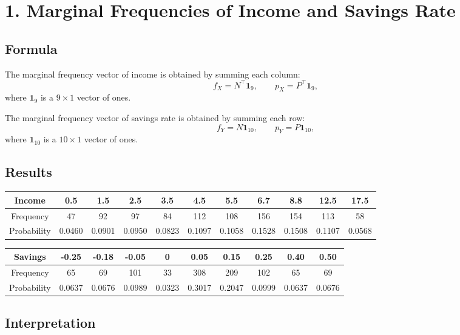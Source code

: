 \documentclass[12pt]{article}
\newcommand{\x}{40pt}
\begin{document}
\vspace{\x}
\section*{1. Marginal Frequencies of Income and Savings Rate}

\subsection*{Formula}

The marginal frequency vector of income is obtained by summing each column:
\[
f_X=N^\top \mathbf{1}_9,
\qquad
p_X=P^\top \mathbf{1}_9,
\]
where $\mathbf{1}_9$ is a $9\times 1$ vector of ones.

The marginal frequency vector of savings rate is obtained by summing each row:
\[
f_Y=N\mathbf{1}_{10},
\qquad
p_Y=P\mathbf{1}_{10},
\]
where $\mathbf{1}_{10}$ is a $10\times 1$ vector of ones.

\subsection*{Results}

\footnotesize{
\begin{center}
\begin{tabular}{c|cccccccccc}
\toprule
Income & 0.5 & 1.5 & 2.5 & 3.5 & 4.5 & 5.5 & 6.7 & 8.8 & 12.5 & 17.5 \\
\midrule
Frequency & 47 & 92 & 97 & 84 & 112 & 108 & 156 & 154 & 113 & 58 \\
Probability & 0.0460 & 0.0901 & 0.0950 & 0.0823 & 0.1097 & 0.1058 & 0.1528 & 0.1508 & 0.1107 & 0.0568 \\
\bottomrule
\end{tabular}
\end{center}
}

\small{
\begin{center}
\begin{tabular}{c|ccccccccc}
\toprule
Savings & -0.25 & -0.18 & -0.05 & 0 & 0.05 & 0.15 & 0.25 & 0.40 & 0.50 \\
\midrule
Frequency & 65 & 69 & 101 & 33 & 308 & 209 & 102 & 65 & 69 \\
Probability & 0.0637 & 0.0676 & 0.0989 & 0.0323 & 0.3017 & 0.2047 & 0.0999 & 0.0637 & 0.0676 \\
\bottomrule
\end{tabular}
\end{center}
}


\subsection*{Interpretation}
\end{document}

